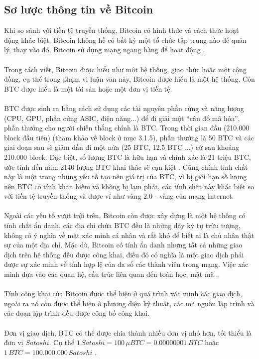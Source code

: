 \subsection{Sơ lược thông tin về Bitcoin}
Khi so sánh với tiền tệ truyền thống, Bitcoin có hình thức và cách thức hoạt 
động khác biệt. Bitcoin không hề có bất kỳ một tổ chức tập trung nào để quản 
lý, thay vào đó, Bitcoin sử dụng mạng ngang hàng để hoạt động \cite{Bitcoin1}.
\\\\
Trong cách viết, Bitcoin được hiểu như một hệ thống, giao thức hoặc một cộng 
đồng, cụ thể trong phạm vi luận văn này, Bitcoin được hiểu là một hệ thống. Còn 
BTC được hiểu là một tài sản hoặc một đơn vị tiền tệ.\\\\
BTC được sinh ra bằng cách sử dụng các tài nguyên phần cứng và năng lượng (CPU, 
GPU, phần cứng ASIC, điện năng...) để đi giải một ``câu đố mã hóa'', phần thưởng 
cho người chiến thắng chính là BTC. Trong thời gian đầu (210.000 block đầu tiên) 
(tham khảo về block ở mục 3.1.5), phần thưởng là 50 BTC và các giai đoạn sau sẽ giảm 
dần đi một nửa (25 BTC, 12.5 BTC ...) cứ sau khoảng 210.000 block. Đặc biệt, số 
lượng BTC là hữu hạn và chính xác là 21 triệu BTC, ước tính đến năm 2140 lượng 
BTC khai thác sẽ cạn kiệt \cite{Bitcoin2}. Cũng chính tính chất này là một trong 
những yếu tố tạo nên giá trị của BTC, vì bị giới hạn số lượng nên BTC có tính 
khan hiếm và không bị lạm phát, các tính chất này khác biệt so với tiền tệ 
truyền thống và được ví như vàng 2.0 - vàng của mạng Internet.\\\\
Ngoài các yếu tố vượt trội trên, Bitcoin còn được xây dựng là một hệ thống có 
tính chất ẩn danh, các địa chỉ chứa BTC đều là những dãy ký tự trừu tượng, không 
có ý nghĩa về mặt xác minh cá nhân và rất khó để biết ai là chủ nhân thật sự của 
một địa chỉ. Mặc dù, Bitcoin có tính ẩn danh nhưng tất cả những giao dịch trên 
hệ thống đều được công khai, điều đó có nghĩa là một giao dịch phải được sự xác 
minh về tính hợp lệ của đa số các thành viên trong mạng. Việc xác minh dựa vào các 
quan hệ, cấu trúc liên quan đến toán học, mật mã... \cite{Bitcoin1, BitcoinPaper}\\\\
Tính công khai của Bitcoin được thể hiện ở quá trình xác minh các giao dịch, 
ngoài ra nó còn được thể hiện ở phương diện kỹ thuật, các mã nguồn lập trình 
và các đoạn lập trình đều được công bố công khai.\\\\
Đơn vị giao dịch, BTC có thể được chia thành nhiều đơn vị nhỏ hơn, tối thiểu 
là đơn vị $Satoshi$. Cụ thể $1 \, Satoshi = 100 \, \mu BTC = 0.00000001 \, BTC$ 
hoặc $1 \, BTC = 100.000.000 \, Satoshi$ \cite{Bitcoin3}.

